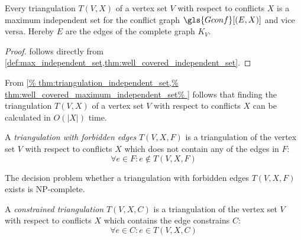 
\begin{theorem}
  \label{thm:triangulation_independent_set}
  Every triangulation \(T(V,X)\) of a vertex set \(V\) with respect
  to conflicts \(X\) is a maximum independent set for the conflict
  graph \(\gls{Gconf}[(E,X)]\) and vice versa. Hereby \(E\) are the
  edges of the complete graph \(K_V\).
\end{theorem}

\begin{proof}
   follows directly from
  \cref{def:max_independent_set,thm:well_covered_independent_set}.
\end{proof}

\begin{theorem}
  From
  \cref{%
    thm:triangulation_independent_set,%
    thm:well_covered_maximum_independent_set%
  }
  follows that finding the triangulation \(T(V,X)\) of a vertex set
  \(V\) with respect to conflicts \(X\) can be calculated in
  \(O(|X|)\) time.
\end{theorem}


\begin{definition}
  A \emph{triangulation with forbidden edges} \(T(V,X,F)\) is a 
  triangulation of the vertex set \(V\) with respect to conflicts
  \(X\) which does not contain any of the edges in \(F\):
  \[ \forall e \in F : e \not\in T(V,X,F) \]
\end{definition}


\begin{theorem}
  The decision problem whether a triangulation with forbidden edges
  \(T(V,X,F)\) exists is NP-complete.
  \cite[triangulation existence problem]{triangulation_forbidden_edges}
\end{theorem}


\begin{definition}
  \label{def:constrained_triangulation}
  A \emph{constrained triangulation} \(T(V,X,C)\) is a triangulation
  of the vertex set \(V\) with respect to conflicts \(X\) which 
  contains the edge constrains \(C\):
  \[ \forall e \in C : e \in T(V,X,C) \]
\end{definition}

